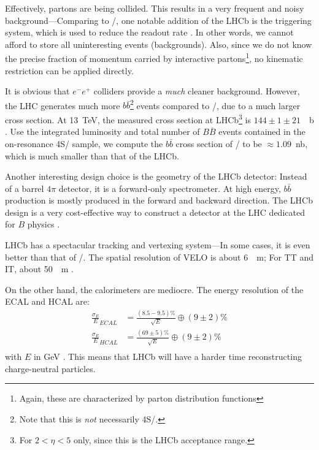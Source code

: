 Effectively, partons are being collided.
This results in a very frequent and noisy background---Comparing to \BaBar/, one
notable addition of the LHCb is the triggering system, which is used to reduce
the readout rate \cite{LHCb:2008}.
In other words, we cannot afford to store all uninteresting events
(backgrounds).
Also, since we do not know the precise fraction of momentum carried by
interactive partons\footnote{
Again, these are characterized by parton distribution functions}, no kinematic
restriction can be applied directly.

It is obvious that $e^- e^+$ colliders provide a \emph{much} cleaner background.
However, the LHC generates much more $b\bar{b}$\footnote{
    Note that this is \emph{not} necessarily \Y4S/.
} events compared to \BaBar/, due to a much larger cross section.
At \SI{13}{TeV}, the measured cross section at LHCb\footnote{
    For $2 < \eta < 5$ only, since this is the LHCb acceptance range.
} is $144 \pm 1 \pm 21$~\si{\mu b} \cite{Aaij:2016avz}.
Use the integrated luminosity and total number of $B\overline{B}$ events
contained in the on-resonance \Y4S/ sample, we compute the $b\bar{b}$ cross
section of \BaBar/ to be $\approx 1.09$~\si{nb}, which is much smaller than that
of the LHCb.

Another interesting design choice is the geometry of the LHCb detector:
Instead of a barrel $4\pi$ detector, it is a forward-only spectrometer.
At high energy, $b\bar{b}$ production is mostly produced
in the forward and backward direction.
The LHCb design is a very cost-effective way to construct a detector at the LHC
dedicated for $B$ physics \cite{LHCb:2008}.

LHCb has a spectacular tracking and vertexing system---In some cases, it is even
better than that of \BaBar/.
The spatial resolution of VELO is about \SI{6}{\mu m};
For TT and IT, about \SI{50}{\mu m} \cite{LHCb:2008}.

On the other hand, the calorimeters are mediocre.
The energy resolution of the ECAL and HCAL are:
\begin{align*}
    \frac{\sigma_E}{E}_{ECAL} &= \frac{(8.5-9.5)\%}{\sqrt{E}}
        \oplus (9 \pm 2)\% \\
    \frac{\sigma_E}{E}_{HCAL} &= \frac{(69 \pm 5)\%}{\sqrt{E}}
        \oplus (9 \pm 2)\% \\
\end{align*}
with $E$ in \si{GeV} \cite{Guz:2017}.
This means that LHCb will have a harder time reconstructing charge-neutral
particles.

